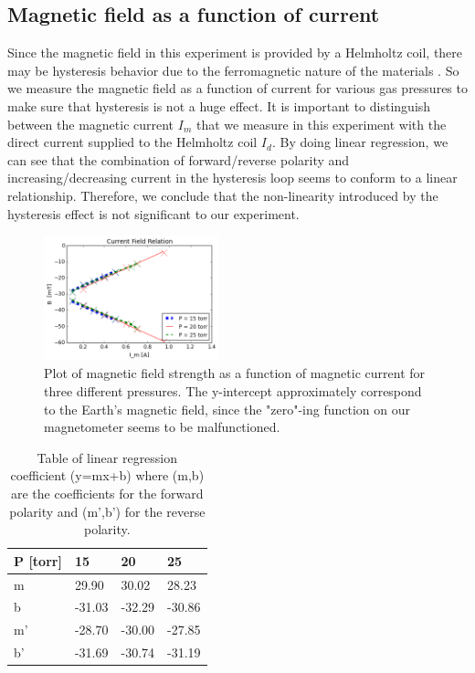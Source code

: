 \documentclass{sigchi}
\begin{document}
\subsection{Magnetic field as a function of current}
Since the magnetic field in this experiment is provided by a Helmholtz coil, there may be hysteresis behavior due to the ferromagnetic nature of the materials \cite{3_sethna_1994}. So we measure the magnetic field as a function of current for various gas pressures to make sure that hysteresis is not a huge effect.  It is important to distinguish between the magnetic current $I_m$  that we measure in this experiment with the direct current supplied to the Helmholtz coil $I_d$. By doing linear regression, we can see that the combination of forward/reverse polarity and increasing/decreasing current in the hysteresis loop seems to conform to a linear relationship. Therefore, we conclude that the non-linearity introduced by the hysteresis effect is not significant to our experiment.
\begin{figure}[h]
\includegraphics[width=0.45\textwidth]{plots/bim.png}
\caption{Plot of magnetic field strength as a function of magnetic current for three different pressures. The y-intercept approximately correspond to the Earth's magnetic field, since the "zero"-ing function on our magnetometer seems to be malfunctioned.}
\label{bim}
\end{figure}
\begin{table}[]
\centering
\caption{Table of linear regression coefficient (y=mx+b) where (m,b) are the coefficients for the forward polarity and (m',b') for the reverse polarity.}
\label{tbl}
\begin{tabular}{|l|l|l|l|}
\hline
P {[}torr{]} & 15     & 20     & 25     \\ \hline
m            & 29.90  & 30.02  & 28.23  \\ \hline
b            & -31.03 & -32.29 & -30.86 \\ \hline
m'           & -28.70 & -30.00 & -27.85 \\ \hline
b'           & -31.69 & -30.74 & -31.19 \\ \hline
\end{tabular}\end{table}
\end{document}
